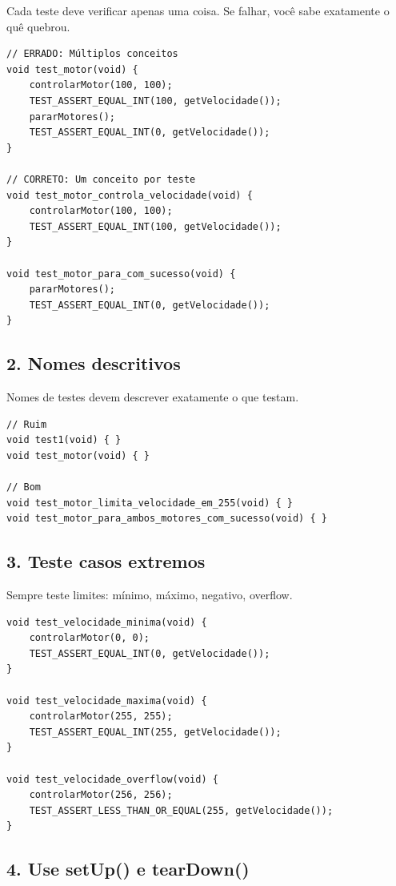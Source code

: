 \documentclass[12pt,a4paper]{article}
\begin{document}
Cada teste deve verificar apenas uma coisa. Se falhar, você sabe exatamente o quê quebrou.

\begin{lstlisting}[caption=Errado vs Correto]
// ERRADO: Múltiplos conceitos
void test_motor(void) {
    controlarMotor(100, 100);
    TEST_ASSERT_EQUAL_INT(100, getVelocidade());
    pararMotores();
    TEST_ASSERT_EQUAL_INT(0, getVelocidade());
}

// CORRETO: Um conceito por teste
void test_motor_controla_velocidade(void) {
    controlarMotor(100, 100);
    TEST_ASSERT_EQUAL_INT(100, getVelocidade());
}

void test_motor_para_com_sucesso(void) {
    pararMotores();
    TEST_ASSERT_EQUAL_INT(0, getVelocidade());
}
\end{lstlisting}

\subsection{2. Nomes descritivos}

Nomes de testes devem descrever exatamente o que testam.

\begin{lstlisting}[caption=Nomes de testes]
// Ruim
void test1(void) { }
void test_motor(void) { }

// Bom
void test_motor_limita_velocidade_em_255(void) { }
void test_motor_para_ambos_motores_com_sucesso(void) { }
\end{lstlisting}

\subsection{3. Teste casos extremos}

Sempre teste limites: mínimo, máximo, negativo, overflow.

\begin{lstlisting}[caption=Cobertura de casos extremos]
void test_velocidade_minima(void) {
    controlarMotor(0, 0);
    TEST_ASSERT_EQUAL_INT(0, getVelocidade());
}

void test_velocidade_maxima(void) {
    controlarMotor(255, 255);
    TEST_ASSERT_EQUAL_INT(255, getVelocidade());
}

void test_velocidade_overflow(void) {
    controlarMotor(256, 256);
    TEST_ASSERT_LESS_THAN_OR_EQUAL(255, getVelocidade());
}
\end{lstlisting}

\subsection{4. Use setUp() e tearDown()}
\end{document}
